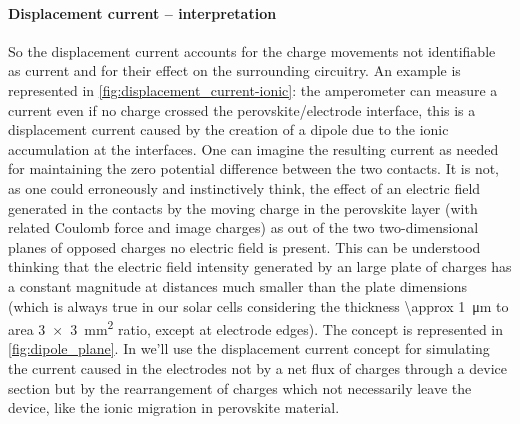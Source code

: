 		\paragraph{Displacement current -- interpretation} So the displacement current accounts for the charge movements not identifiable as current and for their effect on the surrounding circuitry.
		An example is represented in \cref{fig:displacement_current-ionic}: the amperometer can measure a current even if no charge crossed the perovskite/electrode interface, this is a displacement current caused by the creation of a dipole due to the ionic accumulation at the interfaces.
		One can imagine the resulting current as needed for maintaining the zero potential difference between the two contacts.
		It is not, as one could erroneously and instinctively think, the effect of an electric field generated in the contacts by the moving charge in the perovskite layer (with related Coulomb force and image charges) as out of the two two-dimensional planes of opposed charges no electric field is present.
		This can be understood thinking that the electric field intensity generated by an large plate of charges has a constant magnitude at distances much smaller than the plate dimensions (which is always true in our solar cells considering the thickness \SI{\approx 1}{\um} to area \SI{3x3}{\square\mm} ratio, except at electrode edges).
		The concept is represented in \cref{fig:dipole_plane}.
		In  we'll use the displacement current concept for simulating the current caused in the electrodes not by a net flux of charges through a device section but by the rearrangement of charges which not necessarily leave the device, like the ionic migration in perovskite material.

		\begin{figure}
		\end{figure}

